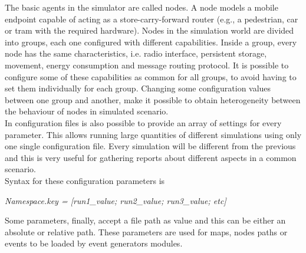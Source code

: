 The basic agents in the simulator are called nodes. A node models a mobile endpoint capable of acting as a store-carry-forward router (e.g., a pedestrian, car or tram with the required hardware). Nodes in the simulation world are divided into groups, each one configured with different capabilities. Inside a group, every node has the same characteristics, i.e. radio interface, persistent storage, movement, energy consumption and message routing protocol. It is possible to configure some of these capabilities as common for all groups, to avoid having to set them individually for each group. Changing some configuration values between one group and another, make it possible to obtain heterogeneity between the behaviour of nodes in simulated scenario.
\\

In configuration files is also possible to provide an array of settings for every parameter. This allows running large quantities of different simulations using only one single configuration file. Every simulation will be different from the previous and this is very useful for gathering reports about different aspects in a common scenario.
\\ Syntax for these configuration parameters is

\begin{center}
\textit{Namespace.key = [run1\_value; run2\_value; run3\_value; etc]}
\end{center}

Some parameters, finally, accept a file path as value and this can be either an absolute or relative path. These parameters are used for maps, nodes paths or events to be loaded by event generators modules.

